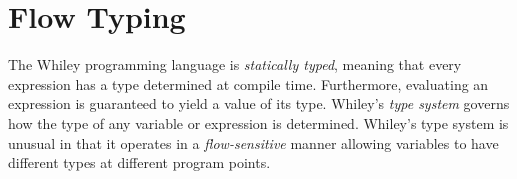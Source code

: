 \chapter{Flow Typing}
The Whiley programming language is {\em statically typed}, meaning that every expression has a type determined at compile time.  Furthermore, evaluating an expression is guaranteed to yield a value of its type.  Whiley's {\em type system} governs how the type of any variable or expression is determined.  Whiley's type system is unusual in that it operates in a {\em flow-sensitive} manner allowing variables to have different types at different program points.



